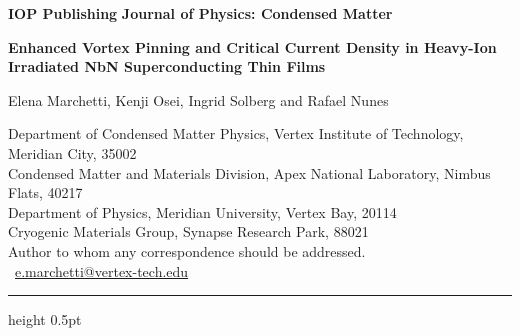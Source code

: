 \documentclass[11pt,a4paper]{article}
\begin{document}
\thispagestyle{fancy}

\noindent
\colorbox{iopBlue}{\parbox{\linewidth}{\color{white}\sffamily\footnotesize
\textbf{IOP Publishing} \hfill \textbf{Journal of Physics: Condensed Matter}}}\par
\vspace{3pt}
\par
\vspace{16pt}

\begin{center}
{\LARGE\bfseries\color{iopBlue}
Enhanced Vortex Pinning and Critical Current Density in Heavy-Ion Irradiated NbN Superconducting Thin Films}\par
\vspace{14pt}
{\large Elena Marchetti, Kenji Osei, Ingrid Solberg and Rafael Nunes}\par
\vspace{8pt}
{\small\color{iopGray}
 Department of Condensed Matter Physics, Vertex Institute of Technology, Meridian City, 35002\\
 Condensed Matter and Materials Division, Apex National Laboratory, Nimbus Flats, 40217\\
 Department of Physics, Meridian University, Vertex Bay, 20114\\
 Cryogenic Materials Group, Synapse Research Park, 88021\\[4pt]
\affil{*}Author to whom any correspondence should be addressed.\\
\faEnvelope\ \href{mailto:e.marchetti@vertex-tech.edu}{e.marchetti@vertex-tech.edu}}
\end{center}

\vspace{6pt}
{\color{iopGray!40}\hrule height 0.5pt}
\vspace{12pt}



\vspace{4pt}
\end{document}
